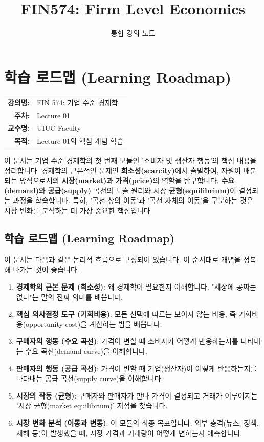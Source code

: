 \documentclass[11pt,a4paper]{book}
\title{\textbf{FIN574: Firm Level Economics}}
\author{통합 강의 노트}
\date{}
\makeatletter
\theoremstyle{definition}
\newcommand{\metainfo}[4]{
\begin{tcolorbox}[
    colback=lightpurple,
    colframe=darkpurple,
    boxrule=1pt,
    arc=2mm,
    left=10pt,
    right=10pt,
    top=8pt,
    bottom=8pt
]
\begin{tabular}{@{}rl@{}}
\textbf{강의명:} & #1 \\[0.3em]
\textbf{주차:} & #2 \\[0.3em]
\textbf{교수명:} & #3 \\[0.3em]
\textbf{목적:} & \begin{minipage}[t]{0.75\textwidth}#4\end{minipage}
\end{tabular}
\end{tcolorbox}
}
\makeatother
\begin{document}
\maketitle
\tableofcontents


\chapter{학습 로드맵 (Learning Roadmap)}
\label{ch:lecture1}

\metainfo{FIN 574: 기업 수준 경제학}{Lecture 01}{UIUC Faculty}{Lecture 01의 핵심 개념 학습}


\begin{summarybox}
이 문서는 기업 수준 경제학의 첫 번째 모듈인 '소비자 및 생산자 행동'의 핵심 내용을 정리합니다. 경제학의 근본적인 문제인 \textbf{희소성(scarcity)}에서 출발하여, 자원이 배분되는 방식으로서의 \textbf{시장(market)}과 \textbf{가격(price)}의 역할을 탐구합니다. \textbf{수요(demand)}와 \textbf{공급(supply)} 곡선의 도출 원리와 시장 \textbf{균형(equilibrium)}이 결정되는 과정을 학습합니다. 특히, '곡선 상의 이동'과 '곡선 자체의 이동'을 구분하는 것은 시장 변화를 분석하는 데 가장 중요한 핵심입니다.
\end{summarybox}


\section{학습 로드맵 (Learning Roadmap)}

이 문서는 다음과 같은 논리적 흐름으로 구성되어 있습니다. 이 순서대로 개념을 정복해 나가는 것이 좋습니다.

\begin{enumerate}
    \item \textbf{경제학의 근본 문제 (희소성)}: 왜 경제학이 필요한지 이해합니다. "세상에 공짜는 없다"는 말의 진짜 의미를 배웁니다.
    \item \textbf{핵심 의사결정 도구 (기회비용)}: 모든 선택에 따르는 보이지 않는 비용, 즉 기회비용(opportunity cost)을 계산하는 법을 배웁니다.
    \item \textbf{구매자의 행동 (수요 곡선)}: 가격이 변할 때 소비자가 어떻게 반응하는지를 나타내는 수요 곡선(demand curve)을 이해합니다.
    \item \textbf{판매자의 행동 (공급 곡선)}: 가격이 변할 때 기업(생산자)이 어떻게 반응하는지를 나타내는 공급 곡선(supply curve)을 이해합니다.
    \item \textbf{시장의 작동 (균형)}: 구매자와 판매자가 만나 가격이 결정되고 거래가 이루어지는 '시장 균형(market equilibrium)' 지점을 찾습니다.
    \item \textbf{시장 변화 분석 (이동과 변동)}: 이 모듈의 최종 목표입니다. 외부 충격(뉴스, 정책, 재해 등)이 발생했을 때, 시장 가격과 거래량이 어떻게 변하는지 예측합니다.
\end{enumerate}
\end{document}
